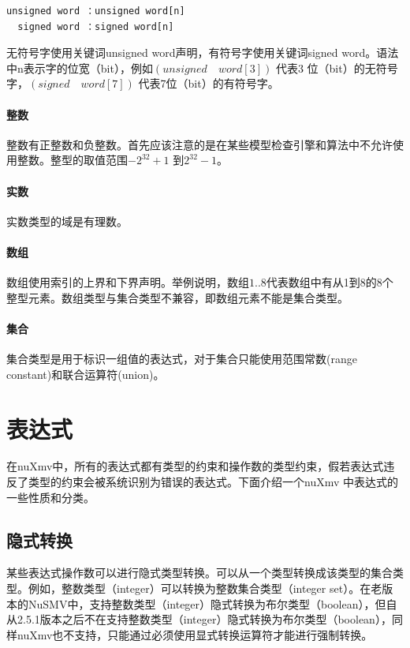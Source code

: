 \begin{lstlisting}
unsigned word ：unsigned word[n]
  signed word ：signed word[n]
\end{lstlisting}

无符号字使用关键词unsigned word声明，有符号字使用关键词signed word。语法中n表示字的位宽（bit），例如$\left(unsigned \quad word[3]\right)$ 代表3 位（bit）的无符号字，$\left(signed \quad word[7]\right)$ 代表7位（bit）的有符号字。

\paragraph{整数}
整数有正整数和负整数。首先应该注意的是在某些模型检查引擎和算法中不允许使用整数。整型的取值范围$-2^{32}+1$ 到$2^{32}-1$。

\paragraph{实数}
实数类型的域是有理数。

\paragraph{数组}
数组使用索引的上界和下界声明。举例说明，数组$1..8$代表数组中有从1到8的8个整型元素。数组类型与集合类型不兼容，即数组元素不能是集合类型。

\paragraph{集合}
集合类型是用于标识一组值的表达式，对于集合只能使用范围常数(range constant)和联合运算符(union)。

\section{表达式}
在nuXmv中，所有的表达式都有类型的约束和操作数的类型约束，假若表达式违反了类型的约束会被系统识别为错误的表达式。下面介绍一个nuXmv 中表达式的一些性质和分类。

\subsection{隐式转换}
某些表达式操作数可以进行隐式类型转换。可以从一个类型转换成该类型的集合类型。例如，整数类型（integer）可以转换为整数集合类型（integer set）。在老版本的NuSMV中，支持整数类型（integer）隐式转换为布尔类型（boolean），但自从2.5.1版本之后不在支持整数类型（integer）隐式转换为布尔类型（boolean），同样nuXmv也不支持，只能通过必须使用显式转换运算符才能进行强制转换。


